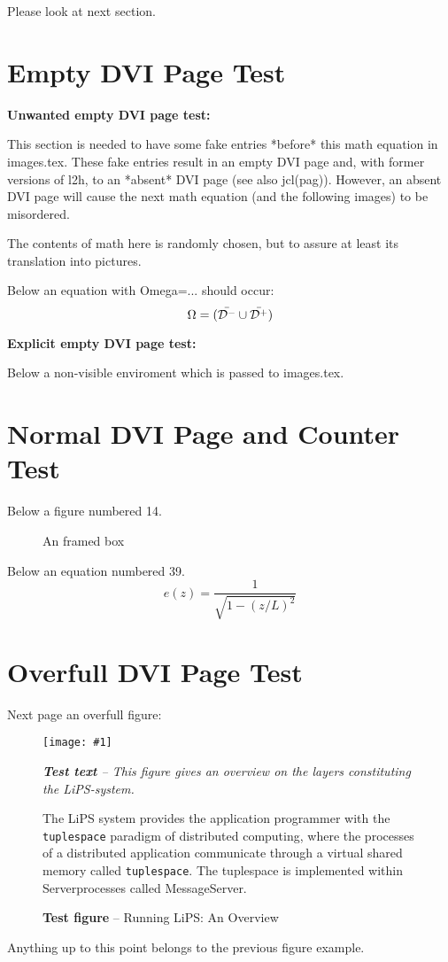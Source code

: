 \documentclass[12pt]{article}
\newcommand{\postscript}[3]{\begin{figure}[ht]%
  \begin{center}\texttt{[image: \#1]}\leavevmode
  \caption{#2}\label{#1}{\em #3}\end{center}\end{figure}}
\begin{document}
Please look at next section.

\section{Empty DVI Page Test}

{\bf Unwanted empty DVI page test:}

This section is needed to have some fake entries *before*
this math equation in images.tex. These fake entries result in an
empty DVI page and, with former versions of l2h, to an *absent*
DVI page (see also jcl(pag)).
However, an absent DVI page will cause the next math equation
(and the following images) to be misordered.

The contents of math here is randomly chosen, but to assure at
least its translation into pictures.

Below an equation with Omega=... should occur:
$$\Omega=(\bar{{\cal D}^-}\cup\bar{{\cal D}^+})$$

{\bf Explicit empty DVI page test:}

Below a non-visible enviroment which is passed to images.tex.

\begin{figure}\null\end{figure}


\section{Normal DVI Page and Counter Test}

Below a figure numbered 14.
\setcounter{figure}{13}
\setcounter{equation}{38}

\begin{figure}[hb]
\begin{center}
\end{center}\caption{An framed box}
\end{figure}

Below an equation numbered 39.
\begin{equation}
e(z)=\frac{1}{\sqrt{1-(z/L)^2}}
\end{equation}

\section{Overfull DVI Page Test}

Next page an overfull figure:

\clearpage
\postscript{pages1}{{\bf Test figure} -- Running LiPS: An Overview}
{{\bf Test text} --
This figure gives an overview on the layers constituting the LiPS-system.

The LiPS system provides the application programmer with the 
{\tt tuplespace} paradigm of distributed 
computing, where the processes of a distributed application communicate
through a virtual shared memory called {\tt tuplespace}.
The tuplespace is implemented within Serverprocesses called MessageServer.
}
\clearpage
Anything up to this point belongs to the previous figure example.
\end{document}
